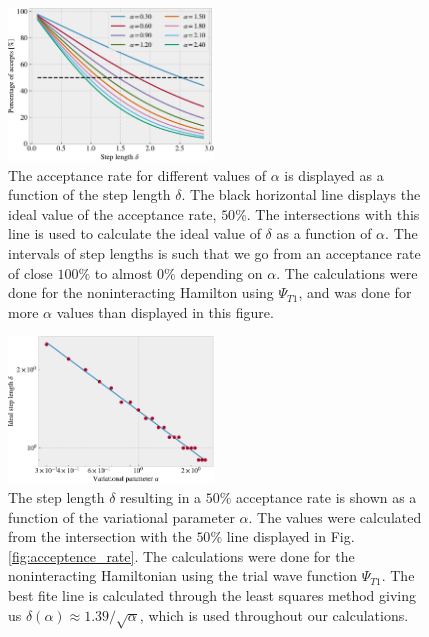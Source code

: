 \documentclass[%
 reprint,
nofootinbib,
aps,
]{revtex4-1}
\begin{document}
\begin{figure}
  \centering
  \includegraphics[width=0.485\textwidth]{../figures/acceptence_rate.pdf}
  \caption{The acceptance rate for different values of $\alpha$ is displayed as a function of the step length $\delta$. The black horizontal line displays the ideal value of the acceptance rate, $50\%$. The intersections with this line is used to calculate the ideal value of $\delta$ as a function of $\alpha$. The intervals of step lengths is such that we go from an acceptance rate of close $100\%$ to almost $0\%$ depending on $\alpha$. The calculations were done for the noninteracting Hamilton using $\Psi_{T1}$, and was done for more $\alpha$ values than displayed in this figure.}
  \label{fig:acceptence_rate}
\end{figure}

\begin{figure}
  \centering
  \includegraphics[width=0.485\textwidth]{../figures/ideal_step.pdf}
  \caption{The step length $\delta$ resulting in a $50\%$ acceptance rate is shown as a function of the variational parameter $\alpha$. The values were calculated from the intersection with the $50\%$ line displayed in Fig. \vref{fig:acceptence_rate}. The calculations were done for the noninteracting Hamiltonian using the trial wave function $\Psi_{T1}$. The best fite line is calculated through the least squares method \cite{squires} giving us $\delta(\alpha) \approx 1.39/\sqrt{\alpha}$, which is used throughout our calculations.}
  \label{fig:ideal_step}
\end{figure}
\end{document}
